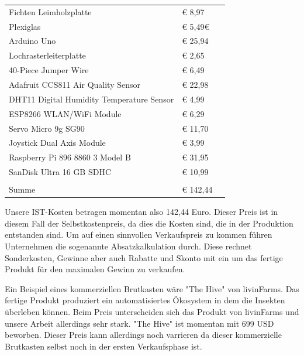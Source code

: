 	\centering
\newlineg
		\caption{Kostenrechnung}
		\label{KORE}
\begin{table}[h]
	\begin{tabular}{lll}
		Fichten	Leimholzplatte						 & € 8,97 		                  \\
		Plexiglas                   				 & € 5,49€                        \\
		Arduino Uno							    	 & € 25,94                        \\
		Lochrasterleiterplatte		                 & € 2,65                   	  \\
		40-Piece Jumper Wire 						 & € 6,49						  \\
		Adafruit CCS811 Air Quality Sensor     		 & € 22,98                        \\
		DHT11 Digital Humidity Temperature Sensor    & € 4,99                         \\
		ESP8266 WLAN/WiFi Module		             & € 6,29                         \\
		Servo Micro 9g SG90 						 & € 11,70   					  \\
		Joystick Dual Axis Module                    & € 3,99                  		  \\
		Raspberry Pi 896 8860 3 Model B  			 & € 31,95					      \\
		SanDisk Ultra 16 GB SDHC          			 & € 10,99                        \\
		\\
		Summe										 & € 142,44						  \\
	\end{tabular}
\end{table}

Unsere IST-Kosten betragen momentan also 142,44 Euro. Dieser Preis ist in diesem Fall der Selbstkostenpreis, da dies die Kosten sind, die in der Produktion entstanden sind. Um auf einen sinnvollen Verkaufspreis zu kommen führen Unternehmen die sogenannte Absatzkalkulation durch. Diese rechnet Sonderkosten, Gewinne aber auch Rabatte und Skonto mit ein um das fertige Produkt für den maximalen Gewinn zu verkaufen. 



Ein Beispiel eines kommerziellen Brutkasten wäre "The Hive" von livinFarms. Das fertige Produkt produziert ein automatisiertes Ökosystem in dem die Insekten überleben können. Beim Preis unterscheiden sich das Produkt von livinFarms und unsere Arbeit allerdings sehr stark.  "The Hive" ist momentan mit 699 USD beworben. Dieser Preis kann allerdings noch varrieren da dieser kommerzielle Brutkasten selbst noch in der ersten Verkaufsphase ist. 



